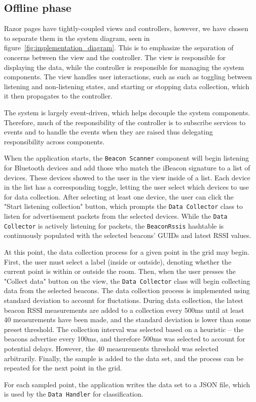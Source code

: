 \subsection{Offline phase}\label{sec:ble_implementation}
Razor pages have tightly-coupled views and controllers, however, we have chosen to separate them in the system diagram, seen in figure~\ref{fig:implementation_diagram}. This is to emphasize the separation of concerns between the view and the controller. The view is responsible for displaying the data, while the controller is responsible for managing the system components. The view handles user interactions, such as such as toggling between listening and non-listening states, and starting or stopping data collection, which it then propagates to the controller.

The system is largely event-driven, which helps decouple the system components. 
Therefore, much of the responsibility of the controller is to subscribe services to events and to handle the events when they are raised thus delegating responsibility across components. 

When the application starts, the \texttt{Beacon Scanner} component will begin listening for Bluetooth devices and add those who match the iBeacon signature to a list of devices.
These devices showed to the user in the view inside of a list.
Each device in the list has a corresponding toggle, letting the user select which devices to use for data collection.
After selecting at least one device, the user can click the "Start listening collection" button, which prompts the \texttt{Data Collector} class to listen for advertisement packets from the selected devices. 
While the \texttt{Data Collector} is actively listening for packets, the \texttt{BeaconRssis} hashtable is continuously populated with the selected beacons' GUIDs and latest RSSI values.


At this point, the data collection process for a given point in the grid may begin.
First, the user must select a label (inside or outside), denoting whether the current point is within or outside the room.
Then, when the user presses the "Collect data" button on the view, the \texttt{Data Collector} class will begin collecting data from the selected beacons.
The data collection process is implemented using standard deviation to account for fluctations.
During data collection, the latest beacon RSSI measurements are added to a collection every 500ms until at least 40 measurements have been made, and the standard deviation is lower than some preset threshold. The collection interval was selected based on a heuristic -- the beacons advertise every 100ms, and therefore 500ms was selected to account for potential delays. However, the 40 measurements threshold was selected arbitrarily.
Finally, the sample is added to the data set, and the process can be repeated for the next point in the grid.

For each sampled point, the application writes the data set to a JSON file, which is used by the \texttt{Data Handler} for classification.